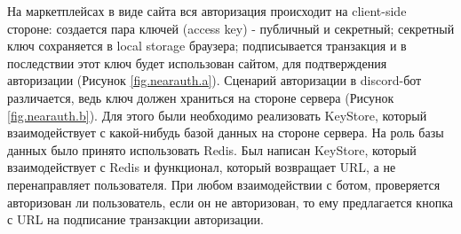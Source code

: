 На маркетплейсах в виде сайта вся авторизация происходит на client-side стороне: создается пара ключей (access key) - публичный и секретный; секретный ключ сохраняется в local storage браузера; подписывается транзакция и в последствии этот ключ будет использован сайтом, для подтверждения авторизации (Рисунок {\color{blue} \ref{fig.nearauth.a}}). Сценарий авторизации в discord-бот различается, ведь ключ должен храниться на стороне сервера (Рисунок {\color{blue} \ref{fig.nearauth.b}}). Для этого были необходимо реализовать KeyStore, который взаимодействует с какой-нибудь базой данных на стороне сервера. На роль базы данных было принято использовать Redis. Был написан KeyStore, который взаимодействует с Redis и функционал, который возвращает URL, а не перенаправляет пользователя. При любом взаимодействии с ботом, проверяется авторизован ли пользователь, если он не авторизован, то ему предлагается кнопка с URL на подписание транзакции авторизации.

\begin{figure}
	\centering
    \caption{}
\end{figure}

